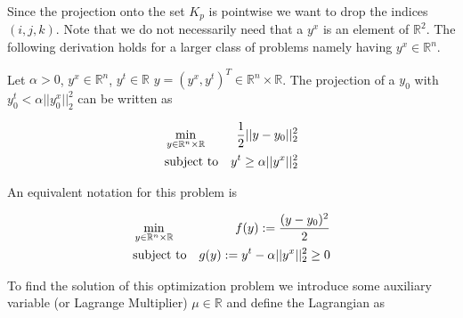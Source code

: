                 Since the projection onto the set $K_{p}$ is pointwise we want to drop the indices $(i, j, k)$. Note that we do not necessarily need that a $y^{x}$ is an element of $\mathbb{R}^{2}$. The following derivation holds for a larger class of problems namely having $y^{x} \in \mathbb{R}^{n}$.
                \begin{describe}[]
                    Let $\alpha > 0$, $y^{x} \in \mathbb{R}^{n}$, $y^{t} \in \mathbb{R}$ %
                    $y = (y^{x}, y^{t})^{T} \in \mathbb{R}^{n} \times \mathbb{R}$.
                    The projection of a $y_{0}$ with $y_{0}^{t} < \alpha ||y_{0}^{x}||_{2}^{2}$ can be written as

                    \begin{eqnarray}
                        &\min\limits_{y \in \mathbb{R}^{n} \times \mathbb{R}}& \frac{1}{2} ||y - y_{0}||_{2}^{2} \notag \\
                        &\textnormal{subject to}& y^{t} \ge \alpha||y^{x}||_{2}^{2} \notag
                    \end{eqnarray}

                    An equivalent notation for this problem is

                    \begin{eqnarray}
                        &\min\limits_{y \in \mathbb{R}^{n} \times \mathbb{R}}& f(y) := \frac{(y - y_{0})^{2}}{2} \notag \\
                        &\textnormal{subject to}& g(y) := y^{t} - \alpha ||y^{x}||_{2}^{2} \ge 0 \notag
                    \end{eqnarray}
                \end{describe}

                To find the solution of this optimization problem we introduce some auxiliary variable (or Lagrange Multiplier) $\mu \in \mathbb{R}$ and define the Lagrangian as

